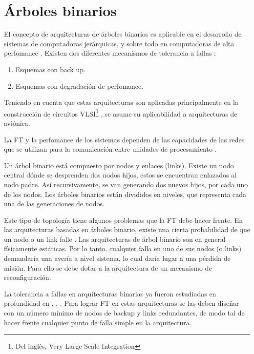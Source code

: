 \begin{comment}
 Bibliografía utilizada aquí:
 
 \cite{Raghavendra84} -> Fault tolerance in Binary Tree Architecture
 
\end{comment}


\section{Árboles binarios}\label{sec:binary_tree}
El concepto de arquitecturas de árboles binarios es aplicable en el desarrollo de sistemas de 
computadoras jerárquicas, y sobre todo en computadoras de alta perfomance \citep{Raghavendra84}. 
Existen dos diferentes mecanismos de tolerancia a fallas \citep{Raghavendra84}:
\begin{enumerate}
 \item Esquemas con back up.
 \item Esquemas con degradación de perfomance.
\end{enumerate}

Teniendo en cuenta que estas arquitecturas son aplicadas principalmente en la construcción de 
circuitos VLSI\footnote{Del inglés, Very Large Scale Integration} \citep{Singh91}, se asume su 
aplicabilidad a arquitecturas de aviónica. 

La \ac{FT} y la perfomance de los sistemas dependen de las capacidades de las redes que se utilizan 
para la comunicación entre unidades de procesamiento \citep{Raghavendra84}. 

Un árbol binario está compuesto por nodos y enlaces (links). Existe un nodo central dónde se 
desprenden dos nodos hijos, estos se encuentran enlazados al nodo padre. Así recursivamente, se 
van generando dos nuevos hijos, por cada uno de los nodos. Los árboles binarios están divididos en 
niveles, que representa cada una de las generaciones de nodos.

Este tipo de topología tiene algunos problemas que la \ac{FT} debe hacer frente. En las 
arquitecturas basadas en árboles binario, existe una cierta probabilidad de que un nodo o un link 
falle \citep{Raghavendra84}. Las arquitecturas de árbol binario son en general físicamente 
estáticas. Por lo tanto, cualquier falla en uno de sus nodos (o links) demandaría una avería a 
nivel sistema, lo cual daría lugar a una pérdida de misión. Para ello se debe dotar a la 
arquitectura de un mecanismo de reconfiguración.

La tolerancia a fallas en arquitecturas binarias ya fueron estudiadas en profundidad en 
\cite{Hayes76}, \cite{Raghavendra84}, \cite{Singh91}. Para lograr \ac{FT} en estas arquitecturas se 
las deben diseñar con un número mínimo de nodos de backup y links redundantes, de modo tal de hacer 
frente cualquier punto de falla simple en la arquitectura. 

